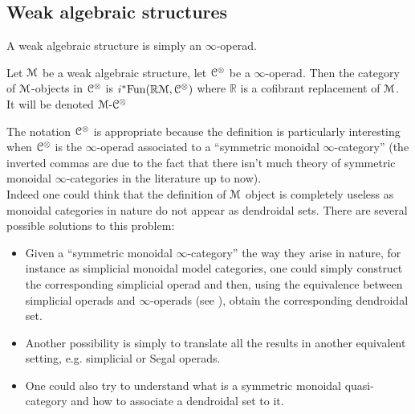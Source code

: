 \begin{refsection}

\section{Weak algebraic structures}

\begin{definition}
A weak algebraic structure is simply an $\infty$-operad.

Let $\mathcal{M}$ be a weak algebraic structure, let $\mathcal{C}^{\otimes}$ be a $\infty$-operad. Then the category of $\mathcal{M}$-objects in $\mathcal{C}^{\otimes}$ is $i^* \mathrm{Fun}(\mathbb{R}\mathcal{M},\mathcal{C}^{\otimes})$ where $\mathbb{R}$ is a cofibrant replacement of $\mathcal{M}$. It will be denoted $\mathcal{M} \textrm{-} \mathcal{C}^{\otimes}$
\end{definition}

The notation $\mathcal{C}^{\otimes}$ is appropriate because the definition is particularly interesting when $\mathcal{C}^{\otimes}$ is the $\infty$-operad associated to a ``symmetric monoidal $\infty$-category'' (the inverted commas are due to the fact that there isn't much theory of symmetric monoidal $\infty$-categories in the literature up to now).\\

Indeed one could think that the definition of $\mathcal{M}$ object is completely useless as monoidal categories in nature do not appear as dendroidal sets. There are several possible solutions to this problem:
\begin{itemize}
	\item Given a ``symmetric monoidal $\infty$-category'' the way they arise in nature, for instance as simplicial monoidal model categories, one could simply construct the corresponding simplicial operad and then, using the equivalence between simplicial operads and $\infty$-operads (see \cite{Ci-Mo2}), obtain the corresponding dendroidal set.

	\item Another possibility is simply to translate all the results in another equivalent setting, e.g. simplicial or Segal operads.
	
	\item One could also try to understand what is a symmetric monoidal quasi-category and how to associate a dendroidal set to it.
\end{itemize}


\end{refsection}
